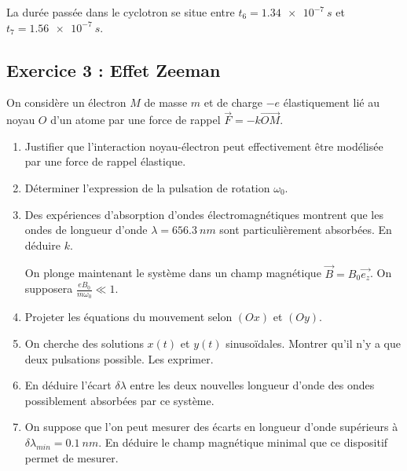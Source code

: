  La durée passée dans le cyclotron se situe entre $t_6 = \SI{1.34e-7}{s}$ et $t_7 = \SI{1.56e-7}{s}$.

\subsection{Exercice 3 : Effet Zeeman}

On considère un électron $M$ de masse $m$ et de charge $-e$ élastiquement lié au noyau $O$ d'un atome par une force de rappel $\vec{F} = -k\overrightarrow{OM}$. 

\begin{enumerate}
	\item Justifier que l'interaction noyau-électron peut effectivement être modélisée par une force de rappel élastique.
	\item Déterminer l'expression de la pulsation de rotation $\omega_0$. 
	\item Des expériences d'absorption d'ondes électromagnétiques montrent que les ondes de longueur d'onde $\lambda = \SI{656.3}{nm}$ sont particulièrement absorbées. En déduire $k$.
	
	On plonge maintenant le système dans un champ magnétique $\vec{B} = B_0 \vec{e_z}$. On supposera $\frac{e B_0}{m \omega_0} \ll 1$. 
	
	\item Projeter les équations du mouvement selon $(Ox)$ et $(Oy)$. 
	\item On cherche des solutions $x(t)$ et $y(t)$ sinusoïdales. Montrer qu'il n'y a que deux pulsations possible. Les exprimer.
	\item En déduire l'écart $\delta \lambda$ entre les deux nouvelles longueur d'onde des ondes possiblement absorbées par ce système.
	\item On suppose que l'on peut mesurer des écarts en longueur d'onde supérieurs à $\delta \lambda_{min} = \SI{0.1}{nm}$. En déduire le champ magnétique minimal que ce dispositif permet de mesurer.
\end{enumerate}
